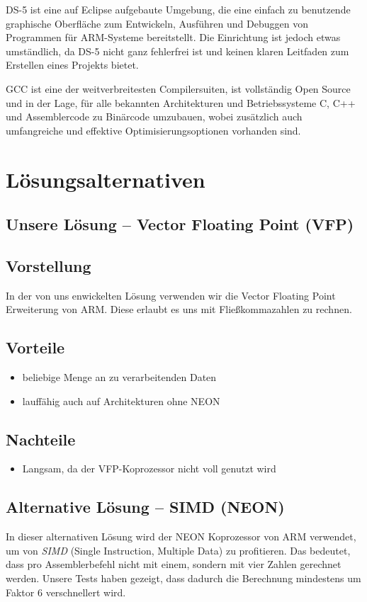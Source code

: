 \documentclass[11pt]{scrartcl}
\begin{document}
DS-5 ist eine auf Eclipse aufgebaute Umgebung, die eine einfach zu benutzende graphische Oberfläche zum Entwickeln, Ausführen und Debuggen von Programmen für ARM-Systeme bereitstellt. Die Einrichtung ist jedoch etwas umständlich, da DS-5 nicht ganz fehlerfrei ist und keinen klaren Leitfaden zum Erstellen eines Projekts bietet.

GCC ist eine der weitverbreitesten Compilersuiten, ist vollständig Open Source und in der Lage, für alle bekannten Architekturen und Betriebssysteme C, C++ und Assemblercode zu Binärcode umzubauen, wobei zusätzlich auch umfangreiche und effektive Optimisierungsoptionen vorhanden sind.

\section{Lösungsalternativen}
\subsection{Unsere Lösung -- Vector Floating Point (VFP)}
\subsection*{Vorstellung}
In der von uns enwickelten Lösung verwenden wir die Vector Floating Point Erweiterung von ARM. 
Diese erlaubt es uns mit Fließkommazahlen zu rechnen.
\subsection*{Vorteile}
\begin{itemize}
\item beliebige Menge an zu verarbeitenden Daten
\item lauffähig auch auf Architekturen ohne NEON
\end{itemize}
\subsection*{Nachteile}
\begin{itemize}
\item Langsam, da der VFP-Koprozessor nicht voll genutzt wird
\end{itemize}
\subsection{Alternative Lösung -- SIMD (NEON)}
In dieser alternativen Lösung wird der NEON Koprozessor von ARM verwendet, um von \emph{SIMD} (Single Instruction, Multiple Data)
zu profitieren. Das bedeutet, dass pro Assemblerbefehl nicht mit einem, sondern mit vier Zahlen gerechnet werden. Unsere Tests haben gezeigt, dass dadurch die Berechnung mindestens um Faktor 6 verschnellert wird.
\end{document}
